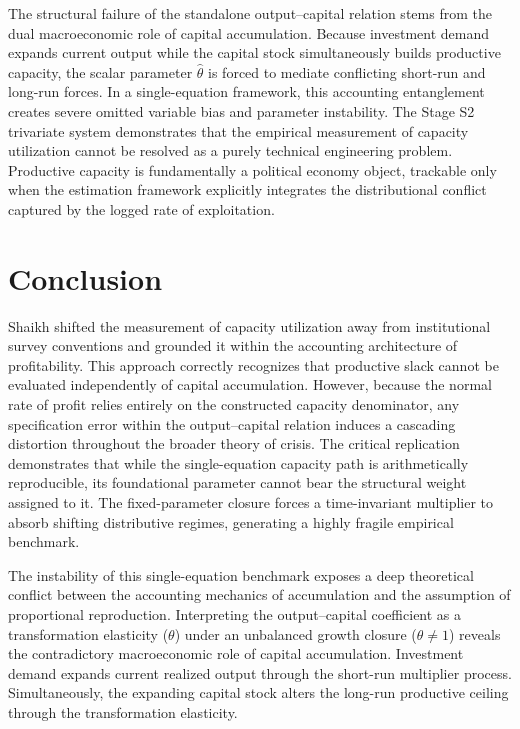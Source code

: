 \documentclass[11pt]{article}
\begin{document}
The structural failure of the standalone output--capital relation stems from the dual macroeconomic role of capital accumulation. Because investment demand expands current output while the capital stock simultaneously builds productive capacity, the scalar parameter $\hat{\theta}$ is forced to mediate conflicting short-run and long-run forces. In a single-equation framework, this accounting entanglement creates severe omitted variable bias and parameter instability. The Stage S2 trivariate system demonstrates that the empirical measurement of capacity utilization cannot be resolved as a purely technical engineering problem. Productive capacity is fundamentally a political economy object, trackable only when the estimation framework explicitly integrates the distributional conflict captured by the logged rate of exploitation.

\section{Conclusion}
\label{sec:conclusion}

Shaikh shifted the measurement of capacity utilization away from institutional survey conventions and grounded it within the accounting architecture of profitability. This approach correctly recognizes that productive slack cannot be evaluated independently of capital accumulation. However, because the normal rate of profit relies entirely on the constructed capacity denominator, any specification error within the output--capital relation induces a cascading distortion throughout the broader theory of crisis. The critical replication demonstrates that while the single-equation capacity path is arithmetically reproducible, its foundational parameter cannot bear the structural weight assigned to it. The fixed-parameter closure forces a time-invariant multiplier to absorb shifting distributive regimes, generating a highly fragile empirical benchmark.

The instability of this single-equation benchmark exposes a deep theoretical conflict between the accounting mechanics of accumulation and the assumption of proportional reproduction. Interpreting the output--capital coefficient as a transformation elasticity ($\theta$) under an unbalanced growth closure ($\theta \neq 1$) reveals the contradictory macroeconomic role of capital accumulation. Investment demand expands current realized output through the short-run multiplier process. Simultaneously, the expanding capital stock alters the long-run productive ceiling through the transformation elasticity.
\end{document}
